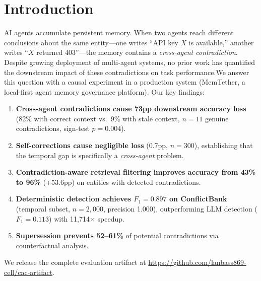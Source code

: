 \documentclass{article}
\begin{document}
\maketitle\begin{abstract}When multiple AI agents share a persistent memory store, they may write contradictory facts about the same entity. We present a causal analysis of the downstream impact of such contradictions in a production multi-agent system (1{,}864 active memories, 13 agent sources, 30 days of deployment). We identify two findings: (1)~cross-agent contradictions cause a 73-percentage-point downstream accuracy loss (82\% vs.\ 9\%, $n{=}11$ genuine contradictions), while self-corrections have negligible impact (0.7\,pp, $n{=}300$); and (2)~contradiction-aware retrieval filtering improves accuracy from 43\% to 96\% (+53.6pp) on entities with detected contradictions. We evaluate our deterministic detection method on ConflictBank's temporal subset ($n{=}2{,}000$, $F_1{=}0.897$, precision 1.000), demonstrate that supersession prevents 52--61\% of potential contradictions via counterfactual analysis, and release the complete evaluation artifact.\end{abstract}\section{Introduction}

AI agents accumulate persistent memory. When two agents reach different conclusions about the same entity---one writes ``API key $X$ is available,'' another writes ``$X$ returned 403''---the memory contains a \emph{cross-agent contradiction}. Despite growing deployment of multi-agent systems, no prior work has quantified the downstream impact of these contradictions on task performance.We answer this question with a causal experiment in a production system (MemTether, a local-first agent memory governance platform). Our key findings:\begin{enumerate}\item \textbf{Cross-agent contradictions cause 73pp downstream accuracy loss} (82\% with correct context vs.\ 9\% with stale context, $n{=}11$ genuine contradictions, sign-test $p{=}0.004$).\item \textbf{Self-corrections cause negligible loss} (0.7pp, $n{=}300$), establishing that the temporal gap is specifically a \emph{cross-agent} problem.\item \textbf{Contradiction-aware retrieval filtering improves accuracy from 43\% to 96\%} (+53.6pp) on entities with detected contradictions.\item \textbf{Deterministic detection achieves $F_1{=}0.897$ on ConflictBank} (temporal subset, $n{=}2{,}000$, precision 1.000), outperforming LLM detection ($F_1{=}0.113$) with 11{,}714$\times$ speedup.\item \textbf{Supersession prevents 52--61\%} of potential contradictions via counterfactual analysis.\end{enumerate}We release the complete evaluation artifact at \url{https://github.com/lanbass869-cell/cac-artifact}.
\end{document}
